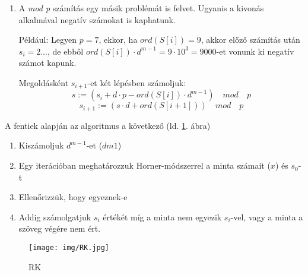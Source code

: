 \documentclass[margin=0px]{article}
\begin{document}
\begin{enumerate}
    \item A {\it mod p} számítás egy másik problémát is felvet. Ugyanis a kivonás alkalmával negatív számokat is kaphatunk.

          Például: Legyen $p=7$, ekkor, ha $ord(S[i]) = 9$, akkor előző számítás után $s_i = 2...$, de ebből $ord(S[i])\cdot d^{m-1} = 9\cdot 10^3 = 9000$-et vonunk ki negatív számot kapunk.

          Megoldásként $s_{i+1}$-et két lépésben számoljuk:
          \[s := (s_i+d\cdot p - ord(S[i])\cdot d^{m-1}) \quad mod \quad p \]
          \[s_{i+1} := (s\cdot d + ord(S[i+1])) \quad mod \quad p \]
\end{enumerate}
A fentiek alapján az algoritmus a következő (ld. \ref{fig:RK}. ábra)
\begin{enumerate}
    \item Kiszámoljuk $d^{m-1}$-et ($dm1$)
    \item Egy iterációban meghatározzuk Horner-módszerrel a minta számait ($x$) és $s_0$-t
    \item Ellenőrizzük, hogy egyeznek-e
    \item Addig számolgatjuk $s_i$ értékét míg a minta nem egyezik $s_i$-vel, vagy a minta a szöveg végére nem ért.
\end{enumerate}
\begin{figure}[H]
    \centering
    \texttt{[image: img/RK.jpg]}
    \caption{RK}
    \label{fig:RK}
\end{figure}
\end{document}
